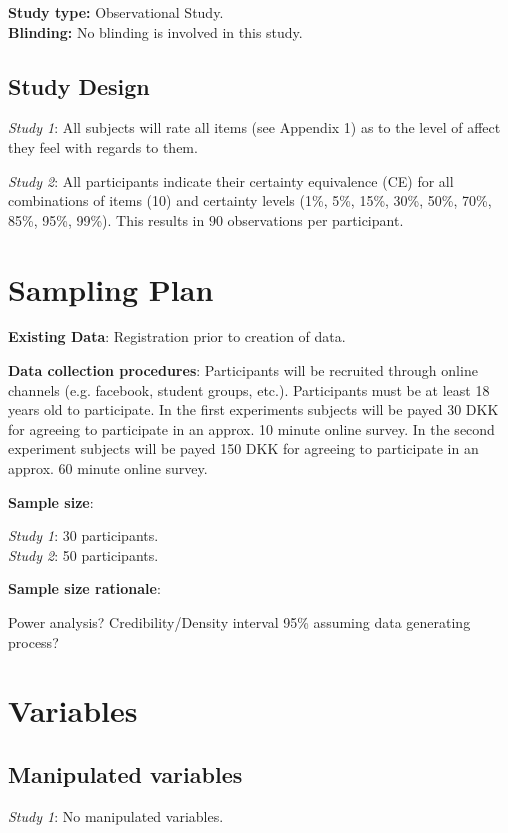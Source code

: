 \documentclass[12pt]{article}
\begin{document}
\textbf{Study type:} Observational Study. \\

\textbf{Blinding:} No blinding is involved in this study. \\

\subsection{Study Design}

\emph{Study 1}: All subjects will rate all items
(see Appendix 1) as to the level of affect they
feel with regards to them.

\emph{Study 2}: All participants
indicate their certainty equivalence (CE) for all
combinations of items (10) and certainty levels
(1\%, 5\%, 15\%, 30\%, 50\%, 70\%, 85\%, 95\%, 99\%).
This results in $90$ observations per participant.

\section{Sampling Plan}

\textbf{Existing Data}: Registration prior
to creation of data.

\textbf{Data collection procedures}:
Participants will be recruited through online
channels (e.g. facebook, student groups, etc.).
Participants must be at least 18 years old to
participate. In the first experiments subjects
will be payed 30 DKK for agreeing to participate
in an approx. 10 minute online survey. In the
second experiment subjects will be payed 150 DKK
for agreeing to participate in an approx. 60 minute
online survey.

\textbf{Sample size}:

\emph{Study 1}: 30 participants. \\
\emph{Study 2}: 50 participants.

\textbf{Sample size rationale}:

Power analysis?
Credibility/Density interval 95\%
assuming data generating process?

\section{Variables}

\subsection{Manipulated variables}
\emph{Study 1}: No manipulated variables. \\
\end{document}
